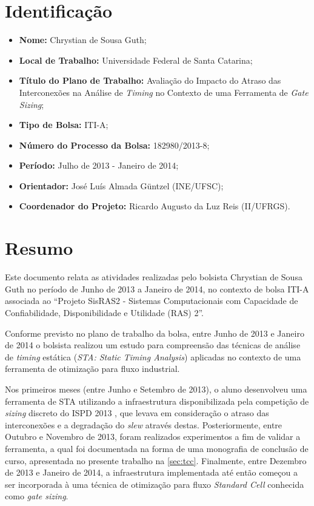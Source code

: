 \documentclass[
	12pt,				%
	openright,			%
	twoside,			%
	a4paper,			%
	english,			%
	french,				%
	spanish,			%
	brazil,				%
	]{abntex2}
\begin{document}
\section{Identificação}

\begin{itemize}
	\item \textbf{Nome:} Chrystian de Sousa Guth;
	\item \textbf{Local de Trabalho:} Universidade Federal de Santa Catarina;
	\item \textbf{Título do Plano de Trabalho:} Avaliação do Impacto do Atraso das Interconexões na Análise de \textit{Timing} no Contexto de uma Ferramenta de \textit{Gate Sizing};
	\item \textbf{Tipo de Bolsa:} ITI-A;
	\item \textbf{Número do Processo da Bolsa:} 182980/2013-8;
	\item \textbf{Período:} Julho de 2013 - Janeiro de 2014;
	\item \textbf{Orientador:} José Luís Almada Güntzel (INE/UFSC);
	\item \textbf{Coordenador do Projeto:} Ricardo Augusto da Luz Reis (II/UFRGS).
\end{itemize}

\section{Resumo}
Este documento relata as atividades realizadas pelo bolsista Chrystian de Sousa Guth no período de Junho de 2013 a Janeiro de 2014, no contexto de bolsa ITI-A associada ao ``Projeto SisRAS2 - Sistemas Computacionais com Capacidade de Confiabilidade, Disponibilidade e Utilidade (RAS) 2''.

Conforme previsto no plano de trabalho da bolsa, entre Junho de 2013 e Janeiro de 2014 o bolsista realizou um estudo para compreensão das técnicas de análise de \textit{timing} estática (\textit{STA: Static Timing Analysis}) aplicadas no contexto de uma ferramenta de otimização para fluxo industrial.

Nos primeiros meses (entre Junho e Setembro de 2013), o aluno desenvolveu uma ferramenta de STA utilizando a infraestrutura disponibilizada pela competição de \textit{sizing} discreto do ISPD 2013 \cite{Contest2013}, que levava em consideração o atraso das interconexões e a degradação do \textit{slew} através destas. Posteriormente, entre Outubro e Novembro de 2013, foram realizados experimentos a fim de validar a ferramenta, a qual foi documentada na forma de uma monografia de conclusão de curso, apresentada no presente trabalho na \autoref{sec:tcc}. Finalmente, entre Dezembro de 2013 e Janeiro de 2014, a infraestrutura implementada até então começou a ser incorporada à uma técnica de otimização para fluxo \textit{Standard Cell} conhecida como \textit{gate sizing}.
\end{document}
